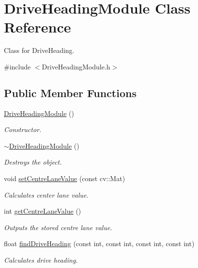 \hypertarget{class_drive_heading_module}{}\section{Drive\+Heading\+Module Class Reference}
\label{class_drive_heading_module}


Class for Drive\+Heading.  




{\ttfamily \#include $<$Drive\+Heading\+Module.\+h$>$}

\subsection*{Public Member Functions}
\begin{DoxyCompactItemize}
\item 
\mbox{\hyperlink{class_drive_heading_module_a6d6281d9c6f9ff614b82950fe60734f1}{Drive\+Heading\+Module}} ()
\begin{DoxyCompactList}\small\item\em Constructor. \end{DoxyCompactList}\item 
\mbox{\hyperlink{class_drive_heading_module_a0826d0b4908ad3dd9e3e986481dae56a}{$\sim$\+Drive\+Heading\+Module}} ()
\begin{DoxyCompactList}\small\item\em Destroys the object. \end{DoxyCompactList}\item 
void \mbox{\hyperlink{class_drive_heading_module_a7a01130962c812d73a09865157970e79}{set\+Centre\+Lane\+Value}} (const cv\+::\+Mat)
\begin{DoxyCompactList}\small\item\em Calculates center lane value. \end{DoxyCompactList}\item 
int \mbox{\hyperlink{class_drive_heading_module_a73730c1e9f7ff4f4bf5384be044e6e67}{get\+Centre\+Lane\+Value}} ()
\begin{DoxyCompactList}\small\item\em Outputs the stored centre lane value. \end{DoxyCompactList}\item 
float \mbox{\hyperlink{class_drive_heading_module_a912c68d6f35ef277d82186c39af1ba36}{find\+Drive\+Heading}} (const int, const int, const int, const int)
\begin{DoxyCompactList}\small\item\em Calculates drive heading. \end{DoxyCompactList}\end{DoxyCompactItemize}


